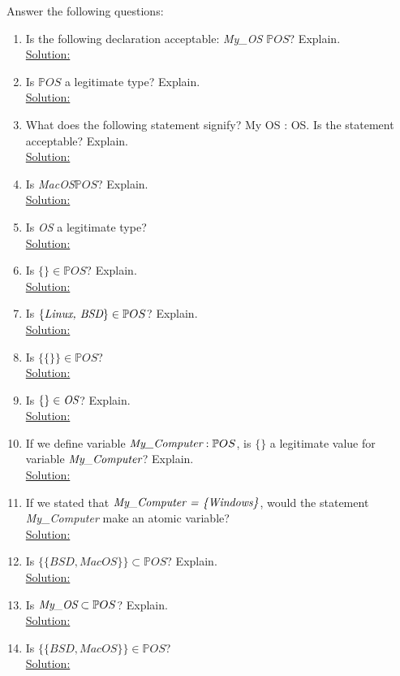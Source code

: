 \noindent Answer the following questions:\
\begin{enumerate}
  \item Is the following declaration acceptable: \emph{My\_OS $\mathbb{P}OS$}? Explain.\\
  \noindent\underline{Solution:}\\
  \item Is $\mathbb{P}OS$ a legitimate type? Explain.\\
  \noindent\underline{Solution:}\\
  \item What does the following statement signify? My OS : OS. Is the statement acceptable? Explain.\\
  \noindent\underline{Solution:}\\
  \item Is \emph{MacOS}$\mathbb{P}OS$? Explain.\\
  \noindent\underline{Solution:}\\
  \item Is \emph{OS} a legitimate type?\\
  \noindent\underline{Solution:}\\
  \item Is $\{ \} \in \mathbb{P}OS$? Explain.\\
  \noindent\underline{Solution:}\\
  \item Is $\{\emph{Linux, BSD} \} \in \mathbb{P}OS$? Explain.\\
  \noindent\underline{Solution:}\\
  \item Is $\{ \{ \} \} \in \mathbb{P}OS$?\\
  \noindent\underline{Solution:}\\
  \item Is $\{ \} \in \emph{OS}$? Explain.\\
  \noindent\underline{Solution:}\\
  \item If we define variable $\emph{My\_Computer} : \mathbb{P}OS$, is $\{ \}$ a legitimate value for variable  $\emph{My\_Computer}$? Explain.\\
  \noindent\underline{Solution:}\\
  \item If we stated that $\emph{{My\_Computer} = \{Windows\}}$, would the statement \emph{My\_Computer} make an atomic variable?\\
  \noindent\underline{Solution:}\\
  \item Is $\{\{BSD, MacOS\}\} \subset \mathbb{P}OS$? Explain.\\
  \noindent\underline{Solution:}\\
  \item Is $\emph{My\_OS} \subset \mathbb{P}OS$? Explain.\\
  \noindent\underline{Solution:}\\
  \item Is $\{{\{BSD, MacOS\}\}} \in \mathbb{P}OS$?\\
  \noindent\underline{Solution:}\\

  

\end{enumerate}


